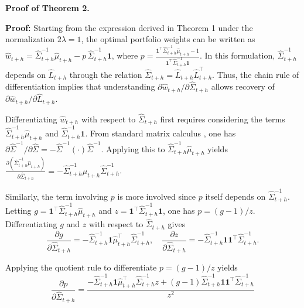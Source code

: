 \noindent\textbf{Proof of Theorem 2.} \label{Appendix:A2}

\textbf{Proof: } Starting from the expression derived in Theorem 1 under the normalization $2\lambda=1$, the optimal portfolio weights can be written as  $\hat{w}_{t+h} = \hat{\Sigma}_{t+h}^{-1}\hat{\mu}_{t+h} - p\,\hat{\Sigma}_{t+h}^{-1}\mathbf{1}$, where  $p = \frac{\mathbf{1}^{\top}\hat{\Sigma}_{t+h}^{-1}\hat{\mu}_{t+h} - 1}{\mathbf{1}^{\top}\hat{\Sigma}_{t+h}^{-1}\mathbf{1}}$.  
In this formulation, $\hat{\Sigma}_{t+h}^{-1}$ depends on $\hat{L}_{t+h}$ through the relation $\hat{\Sigma}_{t+h} = \hat{L}_{t+h}\hat{L}_{t+h}^{\top}$. Thus, the chain rule of differentiation implies that understanding $\partial \hat{w}_{t+h}/\partial \hat{\Sigma}_{t+h}$ allows recovery of $\partial \hat{w}_{t+h}/\partial \hat{L}_{t+h}$.

Differentiating $\hat{w}_{t+h}$ with respect to $\hat{\Sigma}_{t+h}$ first requires considering the terms $\hat{\Sigma}_{t+h}^{-1}\hat{\mu}_{t+h}$ and $\hat{\Sigma}_{t+h}^{-1}\mathbf{1}$. From standard matrix calculus \citep{petersen2008matrix}, one has $\partial \hat{\Sigma}^{-1}/\partial \hat{\Sigma} = -\hat{\Sigma}^{-1}(\cdot)\hat{\Sigma}^{-1}$. Applying this to $\hat{\Sigma}_{t+h}^{-1}\hat{\mu}_{t+h}$ yields $\frac{\partial (\hat{\Sigma}_{t+h}^{-1}\hat{\mu}_{t+h})}{\partial \hat{\Sigma}_{t+h}} = -\hat{\Sigma}_{t+h}^{-1}\hat{\mu}_{t+h}\hat{\Sigma}_{t+h}^{-1}$.

Similarly, the term involving $p$ is more involved since $p$ itself depends on $\hat{\Sigma}_{t+h}^{-1}$. Letting $g=\mathbf{1}^{\top}\hat{\Sigma}_{t+h}^{-1}\hat{\mu}_{t+h}$ and $z=\mathbf{1}^{\top}\hat{\Sigma}_{t+h}^{-1}\mathbf{1}$, one has $p=(g-1)/z$. Differentiating $g$ and $z$ with respect to $\hat{\Sigma}_{t+h}$ gives  
\begin{equation}
    \frac{\partial g}{\partial \hat{\Sigma}_{t+h}} = -\hat{\Sigma}_{t+h}^{-1}\mathbf{1}\hat{\mu}_{t+h}^{\top}\hat{\Sigma}_{t+h}^{-1}, \quad
\frac{\partial z}{\partial \hat{\Sigma}_{t+h}} = -\hat{\Sigma}_{t+h}^{-1}\mathbf{1}\mathbf{1}^{\top}\hat{\Sigma}_{t+h}^{-1}.
\end{equation}

Applying the quotient rule to differentiate $p=(g-1)/z$ yields  
\begin{equation}
    \frac{\partial p}{\partial \hat{\Sigma}_{t+h}}
= \frac{-\hat{\Sigma}_{t+h}^{-1}\mathbf{1}\hat{\mu}_{t+h}^{\top}\hat{\Sigma}_{t+h}^{-1}z + (g-1)\hat{\Sigma}_{t+h}^{-1}\mathbf{1}\mathbf{1}^{\top}\hat{\Sigma}_{t+h}^{-1}}{z^2}
\end{equation}


